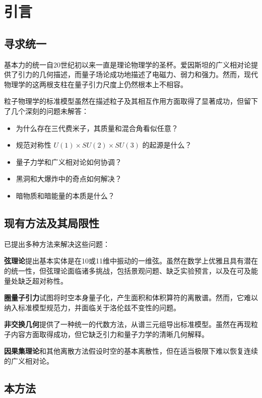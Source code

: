\section{引言}
\label{sec:introduction}

\subsection{寻求统一}

基本力的统一自20世纪初以来一直是理论物理学的圣杯。爱因斯坦的广义相对论提供了引力的几何描述，而量子场论成功地描述了电磁力、弱力和强力。然而，现代物理学的这两根支柱在量子引力尺度上仍然根本上不相容。

粒子物理学的标准模型虽然在描述粒子及其相互作用方面取得了显著成功，但留下了几个深刻的问题未解答：
\begin{itemize}
    \item 为什么存在三代费米子，其质量和混合角看似任意？
    \item 规范对称性 $U(1) \times SU(2) \times SU(3)$ 的起源是什么？
    \item 量子力学和广义相对论如何协调？
    \item 黑洞和大爆炸中的奇点如何解决？
    \item 暗物质和暗能量的本质是什么？
\end{itemize}

\subsection{现有方法及其局限性}

已提出多种方法来解决这些问题：

\textbf{弦理论}提出基本实体是在10或11维中振动的一维弦。虽然在数学上优雅且具有潜在的统一性，但弦理论面临诸多挑战，包括景观问题、缺乏实验预言，以及在可及能量处缺乏超对称性。

\textbf{圈量子引力}试图将时空本身量子化，产生面积和体积算符的离散谱。然而，它难以纳入标准模型规范力，并面临关于洛伦兹不变性的问题。

\textbf{非交换几何}提供了一种统一的代数方法，从谱三元组导出标准模型。虽然在再现粒子内容方面取得成功，但它缺乏引力和量子力学的清晰几何解释。

\textbf{因果集理论}和其他离散方法假设时空的基本离散性，但在适当极限下难以恢复连续的广义相对论。

\subsection{本方法}

